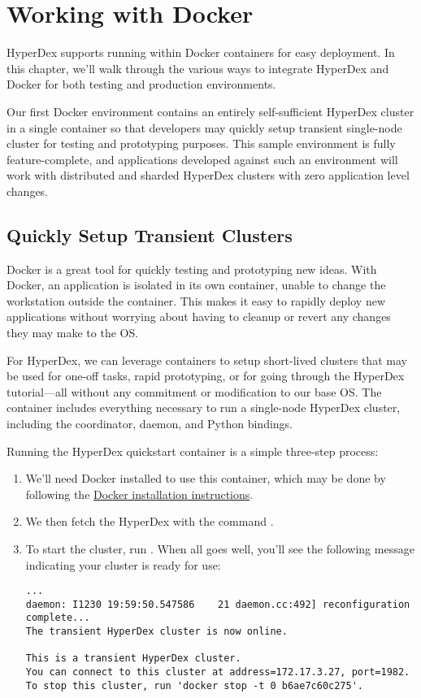 \chapter{Working with Docker}
\label{chap:docker}

HyperDex supports running within Docker containers for easy deployment.  In this
chapter, we'll walk through the various ways to integrate HyperDex and Docker
for both testing and production environments.

Our first Docker environment contains an entirely self-sufficient HyperDex
cluster in a single container so that developers may quickly setup transient
single-node cluster for testing and prototyping purposes.  This sample
environment is fully feature-complete, and applications developed against such
an environment will work with distributed and sharded HyperDex clusters with
zero application level changes.

\section{Quickly Setup Transient Clusters}

Docker is a great tool for quickly testing and prototyping new ideas.  With
Docker, an application is isolated in its own container, unable to change the
workstation outside the container.  This makes it easy to rapidly deploy new
applications without worrying about having to cleanup or revert any changes they
may make to the OS.

For HyperDex, we can leverage containers to setup short-lived clusters that may
be used for one-off tasks, rapid prototyping, or for going through the HyperDex
tutorial---all without any commitment or modification to our base OS.  The
 container includes everything necessary to run a
single-node HyperDex cluster, including the coordinator, daemon, and Python
bindings.

Running the HyperDex quickstart container is a simple three-step process:

\begin{enumerate}
\item We'll need Docker installed to use this container, which may be done by
following the \href{https://docs.docker.com/installation/}{Docker installation
instructions}.
\item We then fetch the HyperDex with the command .
\item To start the cluster, run .  When all goes well, you'll see the following message
indicating your cluster is ready for use:

\begin{verbatim}
...
daemon: I1230 19:59:50.547586    21 daemon.cc:492] reconfiguration complete...
The transient HyperDex cluster is now online.

This is a transient HyperDex cluster.
You can connect to this cluster at address=172.17.3.27, port=1982.
To stop this cluster, run 'docker stop -t 0 b6ae7c60c275'.
\end{verbatim}
\end{enumerate}

